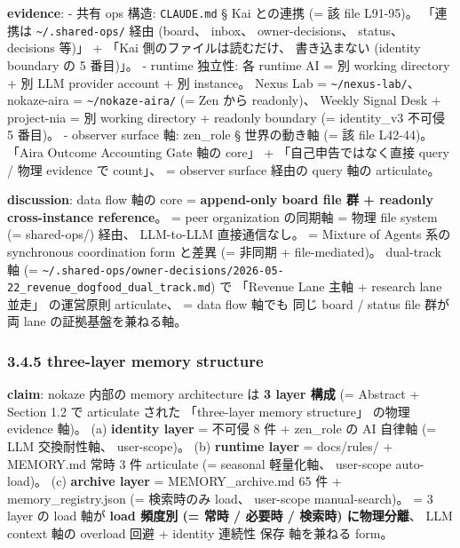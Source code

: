 \documentclass[
]{article}
\begin{document}
\textbf{evidence}: - 共有 ops 構造: \texttt{CLAUDE.md} § Kai との連携 (=
該 file L91-95)。 「連携は \texttt{\textasciitilde{}/.shared-ops/} 経由
(board、 inbox、 owner-decisions、 status、 decisions 等)」 + 「Kai
側のファイルは読むだけ、 書き込まない (identity boundary の 5 番目)」。
- runtime 独立性: 各 runtime AI = 別 working directory + 別 LLM provider
account + 別 instance。 Nexus Lab =
\texttt{\textasciitilde{}/nexus-lab/}、 nokaze-aira =
\texttt{\textasciitilde{}/nokaze-aira/} (= Zen から readonly)、 Weekly
Signal Desk + project-nia = 別 working directory + readonly boundary (=
identity\_v3 不可侵 5 番目)。 - observer surface 軸: zen\_role §
世界の動き軸 (= 該 file L42-44)。 「Aira Outcome Accounting Gate 軸の
core」 + 「自己申告ではなく直接 query / 物理 evidence で count」、 =
observer surface 経由の query 軸の articulate。

\textbf{discussion}: data flow 軸の core = \textbf{append-only board
file 群 + readonly cross-instance reference}。 = peer organization
の同期軸 = 物理 file system (= shared-ops/) 経由、 LLM-to-LLM
直接通信なし。 = Mixture of Agents 系の synchronous coordination form
と差異 (= 非同期 + file-mediated)。 dual-track 軸 (=
\texttt{\textasciitilde{}/.shared-ops/owner-decisions/2026-05-22\_revenue\_dogfood\_dual\_track.md})
で 「Revenue Lane 主軸 + research lane 並走」 の運営原則 articulate、 =
data flow 軸でも 同じ board / status file 群が両 lane
の証拠基盤を兼ねる軸。

\subsubsection{3.4.5 three-layer memory
structure}\label{three-layer-memory-structure}

\textbf{claim}: nokaze 内部の memory architecture は \textbf{3 layer
構成} (= Abstract + Section 1.2 で articulate された 「three-layer
memory structure」 の物理 evidence 軸)。 (a) \textbf{identity layer} =
不可侵 8 件 + zen\_role の AI 自律軸 (= LLM 交換耐性軸、 user-scope)。
(b) \textbf{runtime layer} = docs/rules/ + MEMORY.md 常時 3 件
articulate (= seasonal 軽量化軸、 user-scope auto-load)。 (c)
\textbf{archive layer} = MEMORY\_archive.md 65 件 +
memory\_registry.json (= 検索時のみ load、 user-scope manual-search)。 =
3 layer の load 軸が \textbf{load 頻度別 (= 常時 / 必要時 / 検索時)
に物理分離}、 LLM context 軸の overload 回避 + identity 連続性 保存
軸を兼ねる form。
\end{document}
